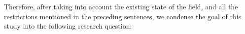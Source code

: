 Therefore, after taking into account the existing state of the field, and all the restrictions mentioned in the preceding sentences, we condense the goal of this study into the following research question:








